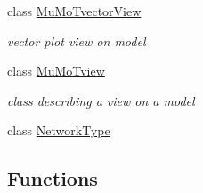 \begin{DoxyCompactItemize}
class \hyperlink{class_mu_mo_t_1_1_mu_mo_tvector_view}{Mu\+Mo\+Tvector\+View}
\begin{DoxyCompactList}\small\item\em vector plot view on model \end{DoxyCompactList}\item 
class \hyperlink{class_mu_mo_t_1_1_mu_mo_tview}{Mu\+Mo\+Tview}
\begin{DoxyCompactList}\small\item\em class describing a view on a model \end{DoxyCompactList}\item 
class \hyperlink{class_mu_mo_t_1_1_network_type}{Network\+Type}
\end{DoxyCompactItemize}
\subsection*{Functions}
